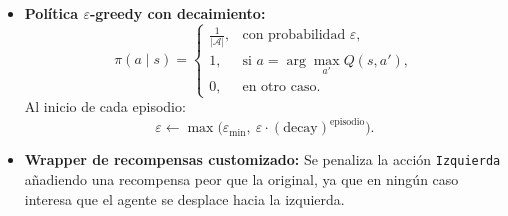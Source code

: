 \begin{itemize}
  \item \textbf{Política \(\varepsilon\)-greedy con decaimiento:}
    \[
      \pi(a \mid s) = 
      \begin{cases}
        \frac{1}{|\mathcal{A}|}, & \text{con probabilidad } \varepsilon,\\
        1, & \text{si } a = \arg\max_{a'}Q(s,a'),\\
        0, & \text{en otro caso.}
      \end{cases}
    \]
    Al inicio de cada episodio:
    \[
      \varepsilon \leftarrow \max\bigl(\varepsilon_{\min},\ \varepsilon \cdot (\text{decay})^{\text{episodio}}\bigr).
    \]
  \item \textbf{Wrapper de recompensas customizado:}
    Se penaliza la acción \texttt{Izquierda} añadiendo una recompensa peor que la original, ya que en ningún caso interesa que el agente se desplace hacia la izquierda.
\end{itemize}

\newpage